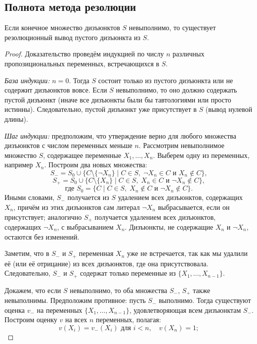 \documentclass[10pt]{article}
\begin{document}
\subsection{Полнота метода резолюции}
\begin{theorem}
Если конечное множество дизъюнктов \(S\) невыполнимо, то существует резолюционный вывод пустого дизъюнкта из \(S\).
\end{theorem}
\begin{proof}
Доказательство проведём индукцией по числу \(n\) различных пропозициональных переменных, встречающихся в \(S\).

\textit{База индукции:} \(n = 0\). Тогда \(S\) состоит только из пустого дизъюнкта или не содержит дизъюнктов вовсе. Если \(S\) невыполнимо, то оно должно содержать пустой дизъюнкт (иначе все дизъюнкты были бы тавтологиями или просто истинны). Следовательно, пустой дизъюнкт уже присутствует в \(S\) (вывод нулевой длины).

\textit{Шаг индукции:} предположим, что утверждение верно для любого множества дизъюнктов с числом переменных меньше \(n\). Рассмотрим невыполнимое множество \(S\), содержащее переменные \(X_1, \dots, X_n\). Выберем одну из переменных, например \(X_n\). Построим два новых множества:
\[
S_- = S_0 \cup \{ C \setminus \{\neg X_n\} \mid C \in S,\; \neg X_n \in C\text{ и } X_n \notin C \},
\]
\[
S_+ = S_0 \cup \{ C \setminus \{X_n\} \mid C \in S,\; X_n \in C \text{ и } \neg X_n \notin C\},
\]
\[
\text{где } S_0 = \{ C \mid C \in S,\; X_n \notin C \text{ и } \neg X_n \notin C \} \text{.}
\]
Иными словами, \(S_-\) получается из \(S\) удалением всех дизъюнктов, содержащих \(X_n\), причём из этих дизъюнктов сам литерал \(\neg X_n\) выбрасывается, если он присутствует; аналогично \(S_+\) получается удалением всех дизъюнктов, содержащих \(\neg X_n\), с выбрасыванием \(X_n\). Дизъюнкты, не содержащие \(X_n\) и \(\neg X_n\), остаются без изменений.

Заметим, что в \(S_-\) и \(S_+\) переменная \(X_n\) уже не встречается, так как мы удалили её (или её отрицание) из всех дизъюнктов, где она присутствовала. Следовательно, \(S_-\) и \(S_+\) содержат только переменные из \(\{X_1,\dots,X_{n-1}\}\).

Докажем, что если \(S\) невыполнимо, то оба множества \(S_-\), \(S_+\) также невыполнимы. Предположим противное: пусть \(S_-\) выполнимо. Тогда существуют оценка \(v_-\) на переменных \(\{X_1,\dots,X_{n-1}\}\), удовлетворяющая всем дизъюнктам \(S_-\). Построим оценку \(v\) на всех \(n\) переменных, полагая:
\[
v(X_i) = v_-(X_i) \text{ для } i < n,\quad v(X_n) = 1;
\]


\end{proof}
\end{document}
